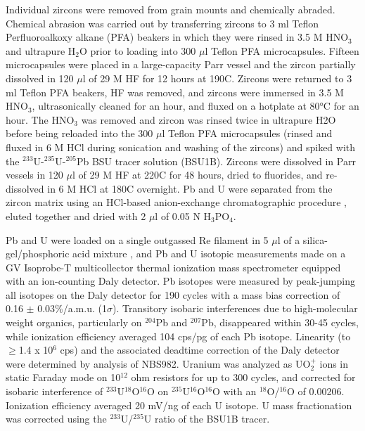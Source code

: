 \documentclass[11pt,letterpaper]{article}
\begin{document}
Individual zircons were removed from grain mounts and chemically abraded. Chemical abrasion was carried out by transferring zircons to 3 ml Teflon Perfluoroalkoxy alkane (PFA) beakers in which they were rinsed in 3.5 M HNO$_\mathrm{3}$ and ultrapure H$_\mathrm{2}$O prior to loading into 300 $\mu$l Teflon PFA microcapsules. Fifteen microcapsules were placed in a large-capacity Parr vessel and the zircon partially dissolved in 120 $\mu$l of 29 M HF for 12 hours at 190\textdegree C. Zircons were returned to 3 ml Teflon PFA beakers, HF was removed, and zircons were immersed in 3.5 M HNO$_\mathrm{3}$, ultrasonically cleaned for an hour, and fluxed on a hotplate at 80°C for an hour. The HNO$_\mathrm{3}$ was removed and zircon was rinsed twice in ultrapure H2O before being reloaded into the 300 $\mu$l Teflon PFA microcapsules (rinsed and fluxed in 6 M HCl during sonication and washing of the zircons) and spiked with the $^{233}$U-$^{235}$U-$^{205}$Pb BSU tracer solution (BSU1B). Zircons were dissolved in Parr vessels in 120 $\mu$l of 29 M HF at 220\textdegree C for 48 hours, dried to fluorides, and re-dissolved in 6 M HCl at 180\textdegree C overnight. Pb and U were separated from the zircon matrix using an HCl-based anion-exchange chromatographic procedure \citep{Krogh1973a}, eluted together and dried with 2 $\mu$l of 0.05 N H$_\mathrm{3}$PO$_\mathrm{4}$.

Pb and U were loaded on a single outgassed Re filament in 5 $\mu$l of a silica-gel/phosphoric acid mixture \citep{Gerstenberger1997a}, and Pb and U isotopic measurements made on a GV Isoprobe-T multicollector thermal ionization mass spectrometer equipped with an ion-counting Daly detector. Pb isotopes were measured by peak-jumping all isotopes on the Daly detector for 190 cycles with a mass bias correction of 0.16 $\pm$ 0.03$\%$/a.m.u. (1$\sigma$). Transitory isobaric interferences due to high-molecular weight organics, particularly on $^{204}$Pb and $^{207}$Pb, disappeared within 30-45 cycles, while ionization efficiency averaged 104 cps/pg of each Pb isotope. Linearity (to $\geq$1.4 x 10$^6$ cps) and the associated deadtime correction of the Daly detector were determined by analysis of NBS982. Uranium was analyzed as UO$_2^+$ ions in static Faraday mode on 10$^{12}$ ohm resistors for up to 300 cycles, and corrected for isobaric interference of $^{233}$U$^{18}$O$^{16}$O on $^{235}$U$^{16}$O$^{16}$O with an $^{18}$O/$^{16}$O of 0.00206. Ionization efficiency averaged 20 mV/ng of each U isotope. U mass fractionation was corrected using the $^{233}$U/$^{235}$U ratio of the BSU1B tracer. 
\end{document}
